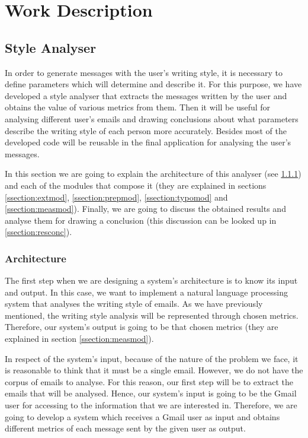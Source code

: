 \chapter{Work Description}
\label{cap:descripcionTrabajo}

\section{Style Analyser}
In order to generate messages with the user's writing style, it is necessary to define parameters which will determine and describe it. For this purpose, we have developed a style analyser that extracts the messages written by the user and obtains the value of various metrics from them. Then it will be useful for analysing different user's emails and drawing conclusions about what parameters describe the writing style of each person more accurately. Besides most of the developed code will be reusable in the final application for analysing the user's messages.

In this section we are going to explain the architecture of this analyser (see \ref{ssection:stylearch}) and each of the modules that compose it (they are explained in sections \ref{ssection:extmod}, \ref{ssection:prepmod}, \ref{ssection:typomod} and \ref{ssection:measmod}). Finally, we are going to discuss the obtained results and analyse them for drawing a conclusion (this discussion can be looked up in \ref{ssection:resconc}).

\subsection{Architecture} \label{ssection:stylearch}
The first step when we are designing a system's architecture is to know its input and output. In this case, we want to implement a natural language processing system that analyses the writing style of emails. As we have previously mentioned, the writing style analysis will be represented through chosen metrics. Therefore, our system's output is going to be that chosen metrics (they are explained in section \ref{ssection:measmod}).

In respect of the system's input, because of the nature of the problem we face, it is reasonable to think that it must be a single email. However, we do not have the corpus of emails to analyse. For this reason, our first step will be to extract the emails that will be analysed. Hence, our system's input is going to be the Gmail user for accessing to the information that we are interested in. Therefore, we are going to develop a system which receives a Gmail user as input and obtains different metrics of each message sent by the given user as output.

